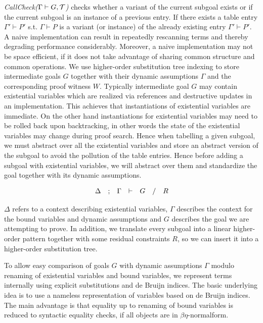 \documentclass{acmconf}
\newcommand{\vd}{\vdash}
\begin{document}
{\em{CallCheck($\Gamma \vd G, \cal{T}$)}} checks whether a variant of
the current subgoal exists or if the current subgoal is an instance of
a previous entry. If there exists a table entry $\Gamma' \vd P'$
s.t. $\Gamma \vd P$ is a variant (or instance) of the already existing
entry $\Gamma' \vd P'$. A naive implementation can result in
repeatedly rescanning terms and thereby degrading performance
considerably. Moreover, a naive implementation may not be space
efficient, if it does not take advantage of sharing common structure
and common operations. We use higher-order substitution tree indexing
to store intermediate goals $G$ together with their dynamic
assumptions $\Gamma$ and the corresponding proof witness
$W$. Typically intermediate goal $G$ may contain existential
variables which are realized via references and destructive updates in
an implementation. This achieves that instantiations of existential variables
are immediate. On the other hand instantiations for existential
variables may need to be rolled back upon backtracking, in other words
the state of the existential variables may change during proof search.
Hence when tabelling a given subgoal, we must abstract over all the
existential variables and store an abstract version of the
subgoal to avoid the pollution of the table entries.
Hence before adding a subgoal with existential variables, we will
abstract over them and standardize the goal together with its dynamic
assumptions. 

\[
\begin{array}{lclclcl}
\multicolumn{1}{c}{\Delta} & ; & \multicolumn{1}{c}{\Gamma} & \vd &
\multicolumn{1}{c}{G}
& / & \multicolumn{1}{c}{R}\\
 \end{array}
\]

$\Delta$ refers to a context describing existential variables,
$\Gamma$ describes the context for the bound variables  and dynamic
assumptions and $G$ describes the goal we are attempting to prove. 
In addition, we translate every subgoal into a linear higher-order pattern
together with some residual constraints $R$, so we can insert it into a
higher-order substitution tree.

To allow easy comparison of goals $G$ with dynamic assumptions
$\Gamma$ modulo renaming of existential variables and bound variables, we
represent terms internally using explicit substitutions
\cite{Abadi:POPL90} and de Bruijn indices. The basic underlying idea
is to use a nameless representation of variables based on de Bruijn
indices. The main advantage is that equality up to renaming
of bound variables is reduced to syntactic equality checks, if all
objects are in $\beta\eta$-normalform.
\end{document}
